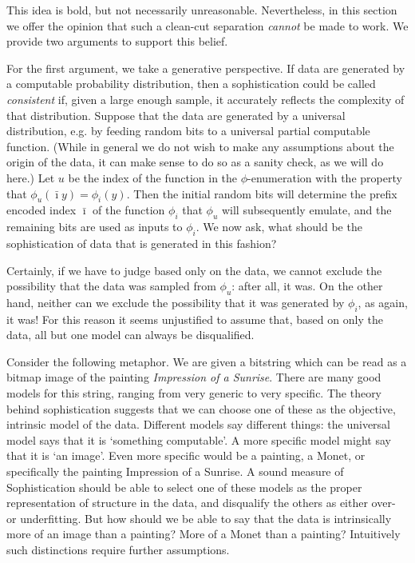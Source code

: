 \documentclass{style/llncs}
\begin{document}
This idea is bold, but not necessarily unreasonable. Nevertheless, in this section we offer the opinion that such a clean-cut separation \emph{cannot} be made to work. We provide two arguments to support this belief.

For the first argument, we take a generative perspective. If data are generated by a computable probability distribution, then a sophistication could be called \emph{consistent} if, given a large enough sample, it accurately reflects the complexity of that distribution. Suppose that the data are generated by a universal distribution, e.g. by feeding random bits to a universal partial computable function. (While in general we do not wish to make any assumptions about the origin of the data, it can make sense to do so as a sanity check, as we will do here.) Let $u$ be the index of the function in the $\phi$-enumeration with the property that $\phi_u(\bar\imath y)=\phi_i(y)$. Then the initial random bits will determine the prefix encoded index $\bar\imath$ of the function $\phi_i$ that $\phi_u$ will subsequently emulate, and the remaining bits are used as inputs to $\phi_i$. We now ask, what should be the sophistication of data that is generated in this fashion?

Certainly, if we have to judge based only on the data, we cannot exclude the possibility that the data was sampled from $\phi_u$: after all, it was.  On the other hand, neither can we exclude the possibility that it was generated by $\phi_i$, as again, it was! For this reason it seems unjustified to assume that, based on only the data, all but one model can always be disqualified.

Consider the following metaphor. We are given a bitstring which can be read as a bitmap image of the painting \emph{Impression of a Sunrise}. There are many good models for this string, ranging from very generic to very specific. The theory behind sophistication suggests that we can choose one of these as the objective, intrinsic model of the data. Different models say different things: the universal model says that it is `something computable'. A more specific model might say that it is `an image'. Even more specific would be a painting, a Monet, or specifically the painting Impression of a Sunrise. A sound measure of Sophistication should be able to select one of these models as the proper representation of structure in the data, and disqualify the others as either over- or underfitting. But how should we be able to say that the data is intrinsically more of an image than a painting? More of a Monet than a painting? Intuitively such distinctions require further assumptions.
\end{document}
